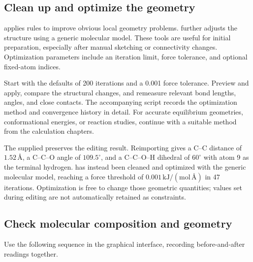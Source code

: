 

\subsection{Clean up and optimize the geometry}

 applies rules to improve obvious local geometry problems.  further adjusts the structure using a generic molecular model. These tools are useful for initial preparation, especially after manual sketching or connectivity changes. Optimization parameters include an iteration limit, force tolerance, and optional fixed-atom indices.

Start with the defaults of 200 iterations and a 0.001 force tolerance. Preview and apply, compare the structural changes, and remeasure relevant bond lengths, angles, and close contacts. The accompanying script records the optimization method and convergence history in detail. For accurate equilibrium geometries, conformational energies, or reaction studies, continue with a suitable method from the calculation chapters.

The supplied  preserves the editing result. Reimporting gives a C--C distance of $1.52\,\text{\AA}$, a C--C--O angle of $109.5^\circ$, and a C--C--O--H dihedral of $60^\circ$ with atom 9 as the terminal hydrogen. \mbox{} has instead been cleaned and optimized with the generic molecular model, reaching a force threshold of $0.001\,\mathrm{kJ/(mol\,\text{\AA})}$ in 47 iterations. Optimization is free to change those geometric quantities; values set during editing are not automatically retained as constraints.

\subsection{Check molecular composition and geometry}\label{sec:molecule-manual-check}

Use the following sequence in the graphical interface, recording before-and-after readings together.

